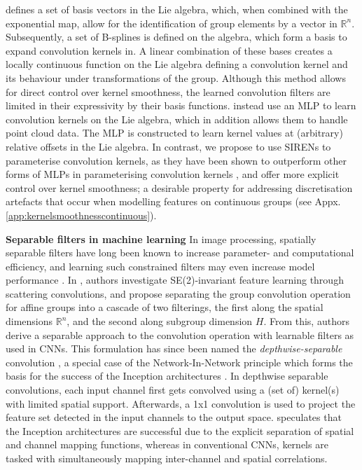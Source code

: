 \documentclass[nohyperref]{article}
\theoremstyle{plain}
\theoremstyle{definition}
\theoremstyle{remark}
\newcommand{\R}{\mathbb{R}}
\begin{document}
\citet{bekkers2019b} defines a set of basis vectors in the Lie algebra, which, when combined with the exponential map, allow for the identification of group elements by a vector in $\mathbb{R}^n$. Subsequently, a set of B-splines is defined on the algebra, which form a basis to expand convolution kernels in. A linear combination of these bases creates a locally continuous function on the Lie algebra defining a convolution kernel and its behaviour under transformations of the group. Although this method allows for direct control over kernel smoothness, the learned convolution filters are limited in their expressivity by their basis functions. \citet{finzi2020generalizing} instead use an MLP to learn convolution kernels on the Lie algebra, which in addition allows them to handle point cloud data. The MLP is constructed to learn kernel values at (arbitrary) relative offsets in the Lie algebra. In contrast, we propose to use SIRENs \citep{sitzmann2020implicit} to parameterise convolution kernels, as they have been shown to outperform other forms of MLPs in parameterising convolution kernels \citep{romero2021ckconv}, and offer more explicit control over kernel smoothness; a desirable property for addressing \break discretisation artefacts that occur when modelling features on continuous groups (see Appx. \ref{app:kernelsmoothnesscontinuous}).

\textbf{Separable filters in machine learning}
In image processing, spatially separable filters have long been known to increase parameter- and computational efficiency, and learning such constrained filters may even increase model performance \citep{rigamonti2013learning}. In \citet{sifre2014rigid}, authors investigate SE(2)-invariant feature learning through scattering convolutions, and propose separating the group convolution operation for affine groups into a cascade of two filterings, the first along the spatial dimensions $\R^n$, and the second along subgroup dimension $H$. From this, authors derive a separable approach to the convolution operation with learnable filters as used in CNNs. This formulation has since been named the \textit{depthwise-separable} convolution \citep{chollet2017xception}, a special case of the Network-In-Network principle \citep{lin2013network} which forms the basis for the success of the Inception architectures \citep{szegedy2015going}. In depthwise separable convolutions, each input channel first gets convolved using a (set of) kernel(s) with limited spatial support. Afterwards, a 1x1 convolution is used to project the feature set detected in the input channels to the output space. \citet{chollet2017xception} speculates that the Inception architectures are successful due to the explicit separation of spatial and channel mapping functions, whereas in conventional CNNs, kernels are tasked with simultaneously mapping inter-channel and spatial correlations.
\end{document}
